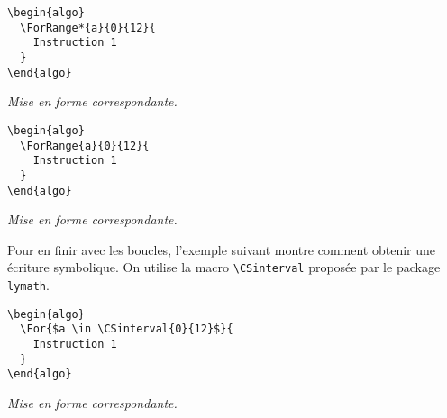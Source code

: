 \documentclass[12pt,a4paper]{article}
\theoremstyle{definition}
\newenvironment{frame-gene}[1][]{
	\begin{tcolorbox}[
		title        = #1, 
		colbacktitle = black!10!white, 
		colback      = white, 
		coltitle     = black,
		fonttitle    = \bfseries\itshape\small, 
		breakable,
		center title]
}{
	\end{tcolorbox}
}
\begin{document}
\begin{multicols}{2}
\centering
\begin{frame-gene}
\begin{verbatim}
\begin{algo}
  \ForRange*{a}{0}{12}{
    Instruction 1
  }
\end{algo}
\end{verbatim}
\end{frame-gene}
\vfill\null
\columnbreak
\textit{Mise en forme correspondante.}
\begin{algo}
\end{algo}
\vfill\null
\end{multicols}


\begin{multicols}{2}
\centering
\begin{frame-gene}
\begin{verbatim}
\begin{algo}
  \ForRange{a}{0}{12}{
    Instruction 1
  }
\end{algo}
\end{verbatim}
\end{frame-gene}
\vfill\null
\columnbreak
\textit{Mise en forme correspondante.}
\begin{algo}
\end{algo}
\vfill\null
\end{multicols}


\vspace{-1em}

Pour en finir avec les boucles, l'exemple suivant montre comment obtenir une écriture symbolique. On utilise la macro \verb+\CSinterval+ proposée par le package \verb+lymath+.


\begin{multicols}{2}
\centering
\begin{frame-gene}
\begin{verbatim}
\begin{algo}
  \For{$a \in \CSinterval{0}{12}$}{
    Instruction 1
  }
\end{algo}
\end{verbatim}
\end{frame-gene}
\vfill\null
\columnbreak
\textit{Mise en forme correspondante.}
\begin{algo}
\end{algo}
\vfill\null
\end{multicols}
\end{document}
